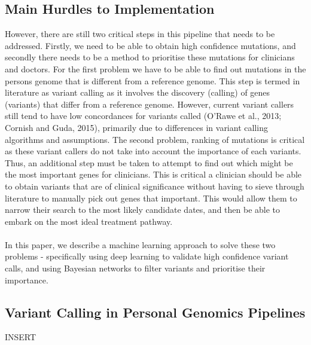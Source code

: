 \documentclass{article}
\begin{document}
\subsection{Main Hurdles to Implementation}
However, there are still two critical steps in this pipeline that needs to be addressed. Firstly, we need to be able to obtain high confidence mutations, and secondly there needs to be a method to prioritise these mutations for clinicians and doctors. For the first problem we have to be able to find out mutations in the persons genome that is different from a reference genome. This step is termed in literature as variant calling as it involves the discovery (calling) of genes (variants) that differ from a reference genome. However, current variant callers still tend to have low concordances for variants called (O'Rawe et al., 2013; Cornish and Guda, 2015), primarily due to differences in variant calling algorithms and assumptions. The second problem, ranking of mutations is critical as these variant callers do not take into account the importance of each variants. Thus, an additional step must be taken to attempt to find out which might be the most important genes for clinicians. This is critical a clinician should be able to obtain variants that are of clinical significance without having to sieve through literature to manually pick out genes that important. This would allow them to narrow their search to the most likely candidate dates, and then be able to embark on the most ideal treatment pathway. \\\\In this paper, we describe a machine learning approach to solve these two problems - specifically using deep learning to validate high confidence variant calls, and using Bayesian networks to filter variants and prioritise their importance. \\
\subsection{Variant Calling in Personal Genomics Pipelines}
INSERT
\end{document}
